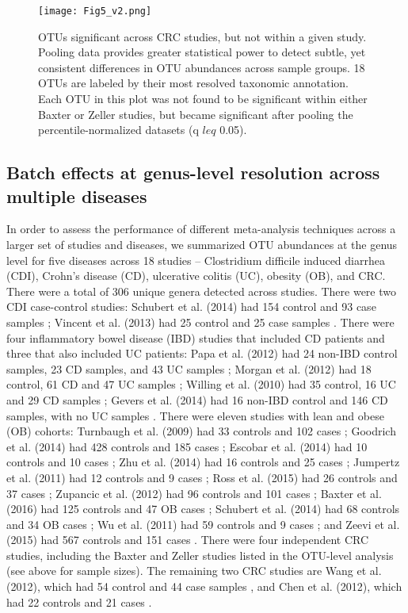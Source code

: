 \begin{figure}[h]
\begin{center}
    \texttt{[image: Fig5\_v2.png]}
    \caption{OTUs significant across CRC studies, but not within a given study. Pooling data provides greater statistical power to detect subtle, yet consistent differences in OTU abundances across sample groups. 18 OTUs are labeled by their most resolved taxonomic annotation. Each OTU in this plot was not found to be significant within either Baxter or Zeller studies, but became significant after pooling the percentile-normalized datasets (q $leq$ 0.05).}\label{percnorm:fig5}
\end{center}
\end{figure}

\subsection{Batch effects at genus-level resolution across multiple diseases}

In order to assess the performance of different meta-analysis techniques across a larger set of studies and diseases, we summarized OTU abundances at the genus level for five diseases across 18 studies -- Clostridium difficile induced diarrhea (CDI), Crohn's disease (CD), ulcerative colitis (UC), obesity (OB), and CRC.
There were a total of 306 unique genera detected across studies. There were two CDI case-control studies: Schubert et al. (2014) had 154 control and 93 case samples \cite{33}; Vincent et al. (2013) had 25 control and 25 case samples \cite{36}.
There were four inflammatory bowel disease (IBD) studies that included CD patients and three that also included UC patients: Papa et al. (2012) had 24 non-IBD control samples, 23 CD samples, and 43 UC samples \cite{23}; Morgan et al. (2012) had 18 control, 61 CD and 47 UC samples \cite{24}; Willing et al. (2010) had 35 control, 16 UC and 29 CD samples \cite{25}; Gevers et al. (2014) had 16 non-IBD control and 146 CD samples, with no UC samples \cite{22}.
There were eleven studies with lean and obese (OB) cohorts: Turnbaugh et al. (2009) had 33 controls and 102 cases \cite{26}; Goodrich et al. (2014) had 428 controls and 185 cases \cite{30}; Escobar et al. (2014) had 10 controls and 10 cases \cite{27}; Zhu et al. (2014) had 16 controls and 25 cases \cite{44}; Jumpertz et al. (2011) had 12 controls and 9 cases \cite{34}; Ross et al. (2015) had 26 controls and 37 cases \cite{29}; Zupancic et al. (2012) had 96 controls and 101 cases \cite{28}; Baxter et al. (2016) had 125 controls and 47 OB cases \cite{18}; Schubert et al. (2014) had 68 controls and 34 OB cases \cite{33}; Wu et al. (2011) had 59 controls and 9 cases \cite{32}; and Zeevi et al. (2015) had 567 controls and 151 cases \cite{31}.
There were four independent CRC studies, including the Baxter and Zeller studies listed in the OTU-level analysis (see above for sample sizes).
The remaining two CRC studies are Wang et al. (2012), which had 54 control and 44 case samples \cite{45}, and Chen et al. (2012), which had 22 controls and 21 cases \cite{21}.

